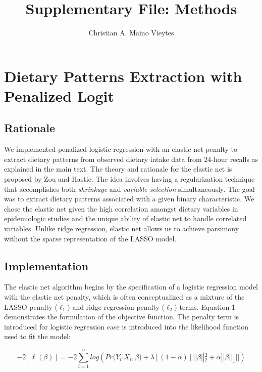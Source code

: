 \documentclass{article}
\title{Supplementary File: Methods}
\author{Christian A. Maino Vieytes}
\date{}
\begin{document}
\maketitle
{}

\tableofcontents


\section{Dietary Patterns Extraction with Penalized Logit}
\subsection{Rationale}
\hspace{\parindent} We implemented penalized logistic regression with an elastic net penalty to extract dietary patterns from observed dietary intake data from 24-hour recalls as explained in the main text. The theory and rationale for the elastic net is proposed by Zou and Hastie. \supercite{zou2005regularization} The idea involves having a regularization technique that accomplishes both \textit{shrinkage} and \textit{variable selection} simultaneously. The goal was to extract dietary patterns associated with a given binary characteristic. We chose the elastic net given the high correlation amongst dietary variables in epidemiologic studies and the unique ability of elastic net to handle correlated variables. Unlike ridge regression, elastic net allows us to achieve parsimony without the sparse representation of the LASSO model.\supercite{zou2005regularization}

\subsection{Implementation}
 \hspace{\parindent}The elastic net algorithm begins by the specification of a logistic regression model with the elastic net penalty, which is often conceptualized as a mixture of the LASSO penalty ($\ell_1$) and ridge regression penalty ($\ell_2$)  terms. Equation 1 demonstrates the formulation of the objective function. The penalty term is introduced for logistic regression case is introduced into the likelihood function used to fit the model:

\begin{equation}
	-2[\ell(\beta)]=-2\sum_{i=1}^nlog({Pr(Y_i|X_i,\beta)+\lambda[(1-\alpha)]||\beta||_2^2+\alpha||\beta||_1]]}) \tag{1}
\end{equation}
\end{document}
